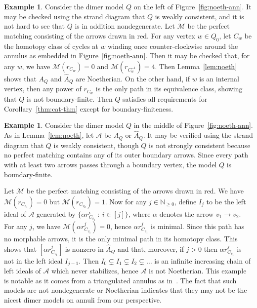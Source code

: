 \documentclass{article}
\theoremstyle{definition}
\newtheorem{example}[thm]{Example}
\begin{document}
\begin{example}\label{ex:left}
	Consider the dimer model $Q$ on the left of Figure~\ref{fig:noeth-ann}. It may be checked using the strand diagram that $Q$ is weakly consistent, and it is not hard to see that $Q$ is in addition nondegenerate. Let $\mathcal M$ be the perfect matching consisting of the arrows drawn in red.
	For any vertex $w\in Q_0$, let $C_w$ be the homotopy class of cycles at $w$ winding once counter-clockwise around the annulus as embedded in Figure~\ref{fig:noeth-ann}. Then it may be checked that, for any $w$, we have $\mathcal M(r_{C_w})=0$ and $\mathcal M(r_{C_w^{-1}})=4$. Then Lemma~\ref{lem:noeth} shows that $A_Q$ and $\widehat A_Q$ are Noetherian.
	On the other hand, if $w$ is an internal vertex, then any power of $r_{C_w}$ is the only path in its equivalence class, showing that $Q$ is not boundary-finite. Then $Q$ satisfies all requirements for Corollary~\ref{thm:cat-thm} except for boundary-finiteness.
\end{example}
\begin{example}\label{ex:right}
	Consider the dimer model $Q$ in the middle of Figure~\ref{fig:noeth-ann}.
	As in Lemma~\ref{lem:noeth}, let $\mathcal A$ be $A_Q$ or $\widehat A_Q$.
	It may be verified using the strand diagram that $Q$ is weakly consistent, though $Q$ is not strongly consistent because no perfect matching contains any of its outer boundary arrows.
	Since every path with at least two arrows passes through a boundary vertex, the model $Q$ is boundary-finite.

	Let $\mathcal M$ be the perfect matching consisting of the arrows drawn in red.
	We have $\mathcal M(r_{C_{v_1}})=0$ but $\mathcal M(r_{C_{v_2}})=1$.
	Now for any $j\in\mathbb N_{\geq0}$, define $I_j$ to be the left ideal of $\mathcal A$ generated by $\{\alpha r_{C_{v_1}}^{i}\ :\ i\in[j]\}$, where $\alpha$ denotes the arrow $v_1\to v_2$. 
	For any $j$, we have $\mathcal M(\alpha r_{C_{v_1}}^j)=0$, hence $\alpha r_{C_{v_1}}^j$ is minimal. Since this path has no morphable arrows, it is the only minimal path in its homotopy class. This shows that $[\alpha r_{C_{v_1}}^j]$ is nonzero in $\widehat A_Q$ and that, moreover, if $j>0$ then $\alpha r_{C_{v_1}}^j$ is not in the left ideal $I_{j-1}$. Then $I_0\subsetneq I_1\subsetneq I_2\subsetneq \dots$ is an infinite increasing chain of left ideals of $\mathcal A$ which never stabilizes, hence $\mathcal A$ is not Noetherian.
	{This example is notable as it comes from a triangulated annulus as in~\cite[\S13]{BKMX}. The fact that such models are not nondegenerate or Noetherian indicates that they may not be the nicest dimer models on annuli from our perspective.}
\end{example}
\end{document}
